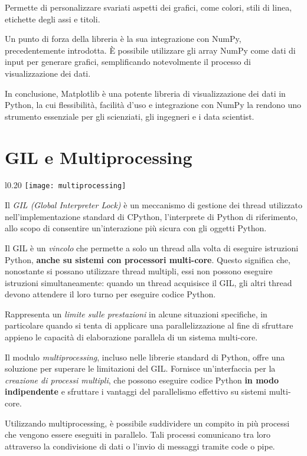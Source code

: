 {{{{{Permette di personalizzare svariati aspetti dei grafici, come colori, stili di linea, etichette degli assi e titoli.

Un punto di forza della libreria è la sua integrazione con NumPy, precedentemente introdotta. È possibile utilizzare gli array NumPy come dati di input per generare grafici, semplificando notevolmente il processo di visualizzazione dei dati.

In conclusione, Matplotlib è una potente libreria di visualizzazione dei dati in Python, la cui flessibilità, facilità d'uso e integrazione con NumPy la rendono uno strumento essenziale per gli scienziati, gli ingegneri e i data scientist.
\newpage
{\section{GIL e Multiprocessing}
	
	\begin{wrapfigure}{l}{0.20\textwidth}
		\centering
		\texttt{[image: multiprocessing]}
	\end{wrapfigure}
Il \textit{GIL (Global Interpreter Lock)} è un meccanismo di gestione dei thread utilizzato nell'implementazione standard di CPython, l'interprete di Python di riferimento, allo scopo di consentire un'interazione più sicura con gli oggetti Python.

Il GIL è un \textit{vincolo} che permette a solo un thread alla volta di eseguire istruzioni Python, \textbf{anche su sistemi con processori multi-core}. Questo significa che, nonostante si possano utilizzare thread multipli, essi non possono eseguire istruzioni simultaneamente: quando un thread acquisisce il GIL, gli altri thread devono attendere il loro turno per eseguire codice Python.

Rappresenta un \textit{limite sulle prestazioni} in alcune situazioni specifiche, in particolare quando si tenta di applicare una parallelizzazione al fine di sfruttare appieno le capacità di elaborazione parallela di un sistema multi-core.

Il modulo \textit{multiprocessing}, incluso nelle librerie standard di Python, offre una soluzione per superare le limitazioni del GIL. Fornisce un'interfaccia per la \textit{creazione di processi multipli}, che possono eseguire codice Python \textbf{in modo indipendente} e sfruttare i vantaggi del parallelismo effettivo su sistemi multi-core.

Utilizzando multiprocessing, è possibile suddividere un compito in più processi che vengono essere eseguiti in parallelo. Tali processi comunicano tra loro attraverso la condivisione di dati o l'invio di messaggi tramite code o pipe.

}}}}}}
